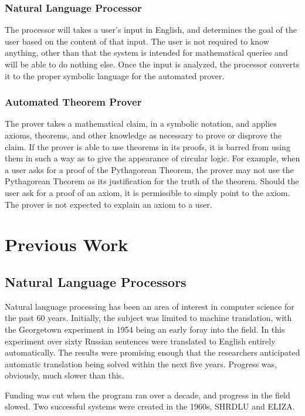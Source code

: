 \documentclass[12pt]{article}
\begin{document}
\subsubsection{Natural Language Processor}
The processor will takes a user's input in English, and determines the goal of the user based on the content of that input. The user is not required to know anything, other than that the system is intended for mathematical queries and will be able to do nothing else. Once the input is analyzed, the processor converts it to the proper symbolic language for the automated prover.
\subsubsection{Automated Theorem Prover}

The prover takes a mathematical claim, in a symbolic notation, and applies axioms, theorems, and other knowledge as necessary to prove or disprove the claim. If the prover is able to use theorems in its proofs, it is barred from using them in such a way as to give the appearance of circular logic. For example, when a user asks for a proof of the Pythagorean Theorem, the prover may not use the Pythagorean Theorem as its justification for the truth of the theorem. %
Should the user ask for a proof of an axiom, it is permissible to simply point to the axiom. The prover is not expected to explain an axiom to a user.


\section{Previous Work}
\subsection{Natural Language Processors}
Natural language processing has been an area of interest in computer science for the past 60 years. Initially, the subject was limited to machine translation, with the Georgetown experiment in 1954 being an early foray into the field. In this experiment over sixty Russian sentences were translated to English entirely automatically. The results were promising enough that the researchers anticipated automatic translation being solved within the next five years. \cite{Hutchins} Progress was, obviously, much slower than this.

Funding was cut when the program ran over a decade, and progress in the field slowed. Two successful systems were created in the 1960s, SHRDLU and ELIZA.
\end{document}
